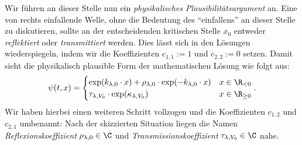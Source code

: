 \documentclass{subfiles}
\begin{document}
        Wir führen an dieser Stelle nun ein \emph{physikalisches Plausibilitätsargument} an. Eine von rechts einfallende Welle, ohne die Bedeutung des \enquote{einfallens} an dieser Stelle zu diskutieren, sollte an der entscheidenden kritischen Stelle $x_0$ entweder \emph{reflektiert} oder \emph{transmittiert} werden. Dies lässt sich in den Lösungen wiederspiegeln, indem wir die Koeffizienten $c_{1,1} := 1$ und $c_{2,2}:=0$ setzen. Damit sieht die physikalisch plausible Form der mathematischen Lösung wie folgt aus:
        \[
            \psi(t,x) = \begin{cases}
                \exp(k_{\lambda,0}\cdot x) + \rho_{\lambda,0}\cdot\exp(-k_{\lambda,0}\cdot x) & x \in \R_{<0} \\
                \tau_{\lambda,V_0}\cdot\exp(\kappa_{\lambda,V_0}) & x \in \R_{\geq 0}
            \end{cases}.
        \]
        Wir haben hierbei einen weiteren Schritt vollzogen und die Koeffizienten $c_{1,2}$ und $c_{2,1}$ umbenannt: Nach der skizzierten Situation liegen die Namen \emph{Reflexionskoeffizient} $\rho_{\lambda,0}\in\C$ und \emph{Transmissionskoeffizient} $\tau_{\lambda,V_0}\in\C$ nahe. 
\end{document}
